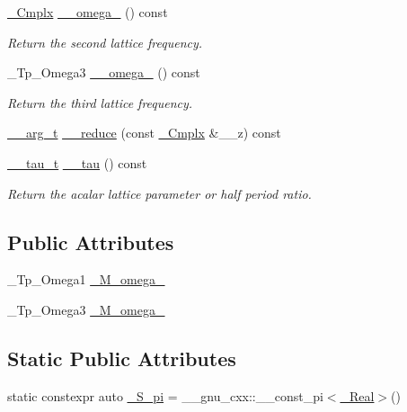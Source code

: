 \begin{DoxyCompactItemize}
\hyperlink{structstd_1_1____detail_1_1____jacobi__lattice__t_a77e286c37544d6ba5e4fb5542d3aad5f}{\+\_\+\+Cmplx} \hyperlink{structstd_1_1____detail_1_1____jacobi__lattice__t_ae6e3f68ebe7ca4d530ae74d058cd3f23}{\+\_\+\+\_\+omega\+\_} () const
\begin{DoxyCompactList}\small\item\em Return the second lattice frequency. \end{DoxyCompactList}\item 
\+\_\+\+Tp\+\_\+\+Omega3 \hyperlink{structstd_1_1____detail_1_1____jacobi__lattice__t_a9fbdad9dbdacf421517a5999a17f11fc}{\+\_\+\+\_\+omega\+\_} () const
\begin{DoxyCompactList}\small\item\em Return the third lattice frequency. \end{DoxyCompactList}\item 
\hyperlink{structstd_1_1____detail_1_1____jacobi__lattice__t_1_1____arg__t}{\+\_\+\+\_\+arg\+\_\+t} \hyperlink{structstd_1_1____detail_1_1____jacobi__lattice__t_ac4070ccb83be9502810c22f47c2c5a80}{\+\_\+\+\_\+reduce} (const \hyperlink{structstd_1_1____detail_1_1____jacobi__lattice__t_a77e286c37544d6ba5e4fb5542d3aad5f}{\+\_\+\+Cmplx} \&\+\_\+\+\_\+z) const
\item 
\hyperlink{structstd_1_1____detail_1_1____jacobi__lattice__t_1_1____tau__t}{\+\_\+\+\_\+tau\+\_\+t} \hyperlink{structstd_1_1____detail_1_1____jacobi__lattice__t_a53604ddbd063b9d71760a0edd7b57e2b}{\+\_\+\+\_\+tau} () const
\begin{DoxyCompactList}\small\item\em Return the acalar lattice parameter or half period ratio. \end{DoxyCompactList}\end{DoxyCompactItemize}
\subsection*{Public Attributes}
\begin{DoxyCompactItemize}
\item 
\+\_\+\+Tp\+\_\+\+Omega1 \hyperlink{structstd_1_1____detail_1_1____jacobi__lattice__t_a742332f9547f056bf0fcbe7819852598}{\+\_\+\+M\+\_\+omega\+\_}
\item 
\+\_\+\+Tp\+\_\+\+Omega3 \hyperlink{structstd_1_1____detail_1_1____jacobi__lattice__t_a0366b0bfc6b0a6033a5cd8f295d105c7}{\+\_\+\+M\+\_\+omega\+\_}
\end{DoxyCompactItemize}
\subsection*{Static Public Attributes}
\begin{DoxyCompactItemize}
\item 
static constexpr auto \hyperlink{structstd_1_1____detail_1_1____jacobi__lattice__t_ab89d6e32a9058989923774c3cf5a8c9a}{\+\_\+\+S\+\_\+pi} = \+\_\+\+\_\+gnu\+\_\+cxx\+::\+\_\+\+\_\+const\+\_\+pi$<$\hyperlink{structstd_1_1____detail_1_1____jacobi__lattice__t_afdf4a474bd195f7b6062b4782202adc7}{\+\_\+\+Real}$>$()
\end{DoxyCompactItemize}


